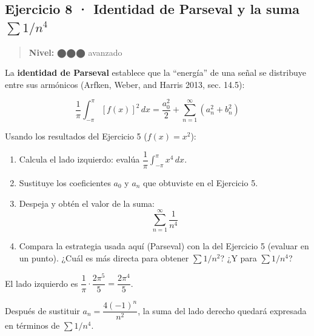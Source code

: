 \documentclass[
  letterpaper,
  DIV=11,
  numbers=noendperiod]{scrreprt}
\providecommand{\tightlist}{%
  \setlength{\itemsep}{0pt}\setlength{\parskip}{0pt}}
\begin{document}
\subsection*{\texorpdfstring{Ejercicio 8 · Identidad de Parseval y la
suma
\(\sum 1/n^4\)}{Ejercicio 8 · Identidad de Parseval y la suma \textbackslash sum 1/n\^{}4}}\label{ejercicio-8-identidad-de-parseval-y-la-suma-sum-1n4}

\begin{quote}
\textbf{Nivel:} ⬤⬤⬤ avanzado
\end{quote}

La \textbf{identidad de Parseval} establece que la ``energía'' de una
señal se distribuye entre sus armónicos (Arfken, Weber, and Harris 2013,
sec. 14.5):

\[
\frac{1}{\pi}\int_{-\pi}^{\pi} [f(x)]^2\,dx =
\frac{a_0^2}{2} + \sum_{n=1}^{\infty}(a_n^2 + b_n^2)
\]

Usando los resultados del Ejercicio 5 (\(f(x) = x^2\)):

\begin{enumerate}
\def\labelenumi{\alph{enumi})}
\tightlist
\item
  Calcula el lado izquierdo: evalúa
  \(\dfrac{1}{\pi}\displaystyle\int_{-\pi}^{\pi} x^4\,dx\).
\item
  Sustituye los coeficientes \(a_0\) y \(a_n\) que obtuviste en el
  Ejercicio 5.
\item
  Despeja y obtén el valor de la suma: \[
  \sum_{n=1}^{\infty} \frac{1}{n^4}
  \]
\item
  Compara la estrategia usada aquí (Parseval) con la del Ejercicio 5
  (evaluar en un punto). ¿Cuál es más directa para obtener
  \(\sum 1/n^2\)? ¿Y para \(\sum 1/n^4\)?
\end{enumerate}

\begin{tcolorbox}[enhanced jigsaw, colbacktitle=quarto-callout-tip-color!10!white, toptitle=1mm, titlerule=0mm, rightrule=.15mm, colframe=quarto-callout-tip-color-frame, leftrule=.75mm, breakable, colback=white, bottomrule=.15mm, coltitle=black, bottomtitle=1mm, title=\textcolor{quarto-callout-tip-color}{\faLightbulb}\hspace{0.5em}{Pista}, arc=.35mm, toprule=.15mm, left=2mm, opacitybacktitle=0.6, opacityback=0]

El lado izquierdo es
\(\dfrac{1}{\pi}\cdot\dfrac{2\pi^5}{5} = \dfrac{2\pi^4}{5}\).

Después de sustituir \(a_n = \dfrac{4(-1)^n}{n^2}\), la suma del lado
derecho quedará expresada en términos de \(\sum 1/n^4\).

\end{tcolorbox}
\end{document}
